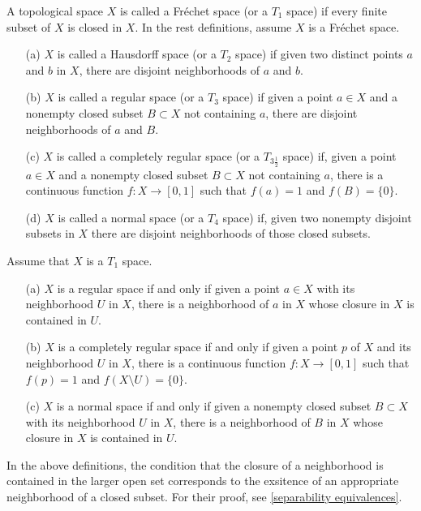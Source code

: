 \begin{defi}
    A topological space $X$ is called a Fr\'echet space (or a $T_1$ space) if every finite subset of $X$ is closed in $X$.
    In the rest definitions, assume $X$ is a Fr\'echet space.
    \begin{enumerate}
        \item[(a)]
        {
            $X$ is called a Hausdorff space (or a $T_2$ space) if given two distinct points $a$ and $b$ in $X$, there are disjoint neighborhoods of $a$ and $b$.
        }
        \item[(b)]
        {
            $X$ is called a regular space (or a $T_3$ space) if given a point $a\in X$ and a nonempty closed subset $B\subset X$ not containing $a$, there are disjoint neighborhoods of $a$ and $B$.
        }
        \item[(c)]
        {
            $X$ is called a completely regular space (or a $T_{3\frac{1}{2}}$ space) if, given a point $a\in X$ and a nonempty closed subset $B\subset X$ not containing $a$, there is a continuous function $f: X\rightarrow[0, 1]$ such that $f(a)=1$ and $f(B)=\{0\}$.
        }
        \item[(d)]
        {
            $X$ is called a normal space (or a $T_4$ space) if, given two nonempty disjoint subsets in $X$ there are disjoint neighborhoods of those closed subsets.
        }
    \end{enumerate}
\end{defi}
\begin{rmk}
    Assume that $X$ is a $T_1$ space.
    \begin{enumerate}
        \item[(a)]
        {
            $X$ is a regular space if and only if given a point $a\in X$ with its neighborhood $U$ in $X$, there is a neighborhood of $a$ in $X$ whose closure in $X$ is contained in $U$.
        }
        \item[(b)]
        {
            $X$ is a completely regular space if and only if given a point $p$ of $X$ and its neighborhood $U$ in $X$, there is a continuous function $f: X\rightarrow[0, 1]$ such that $f(p)=1$ and $f(X\setminus U)=\{0\}$.
        }
        \item[(c)]
        {
            $X$ is a normal space if and only if given a nonempty closed subset $B\subset X$ with its neighborhood $U$ in $X$, there is a neighborhood of $B$ in $X$ whose closure in $X$ is contained in $U$.
        }
    \end{enumerate}
    In the above definitions, the condition that the closure of a neighborhood is contained in the larger open set corresponds to the exsitence of an appropriate neighborhood of a closed subset.
    For their proof, see \cref{separability equivalences}.
\end{rmk}

